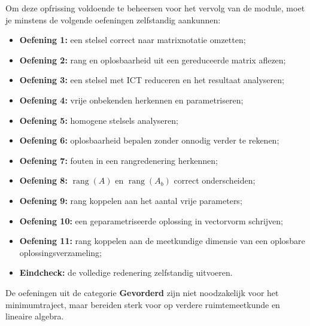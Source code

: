 \documentclass{ximera}
\begin{document}


\begin{opmerking}
Om deze opfrissing voldoende te beheersen voor het vervolg van de module,
moet je minstens de volgende oefeningen zelfstandig aankunnen:

\begin{itemize}
    \item \textbf{Oefening 1:} een stelsel correct naar matrixnotatie omzetten;
    \item \textbf{Oefening 2:} rang en oplosbaarheid uit een gereduceerde matrix aflezen;
    \item \textbf{Oefening 3:} een stelsel met ICT reduceren en het resultaat analyseren;
    \item \textbf{Oefening 4:} vrije onbekenden herkennen en parametriseren;
    \item \textbf{Oefening 5:} homogene stelsels analyseren;
    \item \textbf{Oefening 6:} oplosbaarheid bepalen zonder onnodig verder te rekenen;
    \item \textbf{Oefening 7:} fouten in een rangredenering herkennen;
    \item \textbf{Oefening 8:} \(\operatorname{rang}(A)\) en
          \(\operatorname{rang}(A_b)\) correct onderscheiden;
    \item \textbf{Oefening 9:} rang koppelen aan het aantal vrije parameters;
    \item \textbf{Oefening 10:} een geparametriseerde oplossing in vectorvorm schrijven;
    \item \textbf{Oefening 11:} rang koppelen aan de meetkundige dimensie
          van een oplosbare oplossingsverzameling;
    \item \textbf{Eindcheck:} de volledige redenering zelfstandig uitvoeren.
\end{itemize}

De oefeningen uit de categorie \textbf{Gevorderd} zijn niet noodzakelijk
voor het minimumtraject, maar bereiden sterk voor op verdere
ruimtemeetkunde en lineaire algebra.
\end{opmerking}
\end{document}
